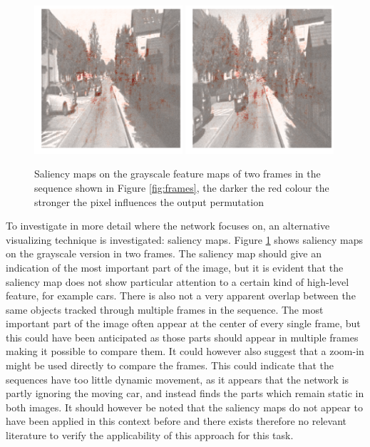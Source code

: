 \begin{figure}[t]
\centering
\includegraphics[width=0.49\textwidth]{images/saliency_1-0.png}
\includegraphics[width=0.49\textwidth]{images/saliency_1-1.png}
\caption{Saliency maps on the grayscale feature maps of two frames in the sequence shown in Figure \ref{fig:frames}, the darker the red colour the stronger the pixel influences the output permutation}
\label{fig:saliency}
\end{figure}

To investigate in more detail where the network focuses on, an alternative visualizing technique is investigated: saliency maps. Figure \ref{fig:saliency} shows saliency maps on the grayscale version in two frames. The saliency map should give an indication of the most important part of the image, but it is evident that the saliency map does not show particular attention to a certain kind of high-level feature, for example cars. There is also not a very apparent overlap between the same objects tracked through multiple frames in the sequence. The most important part of the image often appear at the center of every single frame, but this could have been anticipated as those parts should appear in multiple frames making it possible to compare them. It could however also suggest that a zoom-in might be used directly to compare the frames. This could indicate that the sequences have too little dynamic movement, as it appears that the network is partly ignoring the moving car, and instead finds the parts which remain static in both images. It should however be noted that the saliency maps do not appear to have been applied in this context before and there exists therefore no relevant literature to verify the applicability of this approach for this task.

